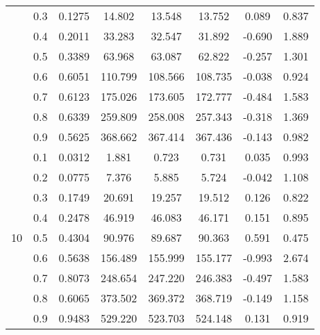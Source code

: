 \documentclass[11pt,a4paper]{report}
\begin{document}
\begin{longtable}{ | c | c || c | c | c | c | c | c | }
 & 0.3 & 0.1275 & 14.802 & 13.548 & 13.752 & 0.089 & 0.837 \\
 & 0.4 & 0.2011 & 33.283 & 32.547 & 31.892 & -0.690 & 1.889 \\
 & 0.5 & 0.3389 & 63.968 & 63.087 & 62.822 & -0.257 & 1.301 \\
 & 0.6 & 0.6051 & 110.799 & 108.566 & 108.735 & -0.038 & 0.924 \\
 & 0.7 & 0.6123 & 175.026 & 173.605 & 172.777 & -0.484 & 1.583 \\
 & 0.8 & 0.6339 & 259.809 & 258.008 & 257.343 & -0.318 & 1.369 \\
 & 0.9 & 0.5625 & 368.662 & 367.414 & 367.436 & -0.143 & 0.982 \\
 \hline
\multirow{9}{*}{10} & 0.1 & 0.0312 & 1.881 & 0.723 & 0.731 & 0.035 & 0.993 \\
 & 0.2 & 0.0775 & 7.376 & 5.885 & 5.724 & -0.042 & 1.108 \\
 & 0.3 & 0.1749 & 20.691 & 19.257 & 19.512 & 0.126 & 0.822 \\
 & 0.4 & 0.2478 & 46.919 & 46.083 & 46.171 & 0.151 & 0.895 \\
 & 0.5 & 0.4304 & 90.976 & 89.687 & 90.363 & 0.591 & 0.475 \\
 & 0.6 & 0.5638 & 156.489 & 155.999 & 155.177 & -0.993 & 2.674 \\
 & 0.7 & 0.8073 & 248.654 & 247.220 & 246.383 & -0.497 & 1.583 \\
 & 0.8 & 0.6065 & 373.502 & 369.372 & 368.719 & -0.149 & 1.158 \\
 & 0.9 & 0.9483 & 529.220 & 523.703 & 524.148 & 0.131 & 0.919 \\
 \hline
\hline
\end{longtable}
\end{document}
